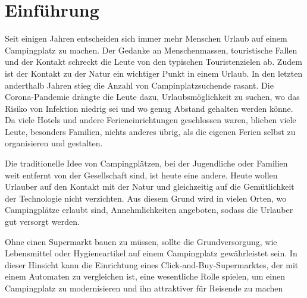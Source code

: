 \section{Einführung}



Seit einigen Jahren entscheiden sich immer mehr Menschen Urlaub auf einem Campingplatz zu machen. Der Gedanke an 
Menschenmassen, touristische Fallen und der Kontakt schreckt die Leute von den typischen Touristenzielen ab. Zudem 
ist der Kontakt zu der Natur ein wichtiger Punkt in einem Urlaub.  In den letzten anderthalb Jahren stieg die Anzahl 
von Campinplatzsuchende rasant. Die Corona-Pandemie drängte die Leute dazu, Urlaubsmöglichkeit zu suchen, wo das Risiko
von Infektion niedrig sei und wo genug Abstand gehalten werden könne. Da viele Hotels und andere Ferieneinrichtungen
geschlossen waren, blieben viele Leute, besonders Familien, nichts anderes übrig, als die eigenen Ferien selbst zu 
organisieren und gestalten.

Die traditionelle Idee von Campingplätzen, bei der Jugendliche oder Familien weit entfernt von der Gesellschaft sind, 
ist heute eine andere. Heute wollen Urlauber auf den Kontakt mit der Natur und gleichzeitig auf die Gemütlichkeit 
der Technologie nicht verzichten. Aus diesem Grund wird in vielen Orten, wo Campingplätze erlaubt sind, Annehmlichkeiten
angeboten, sodass die Urlauber gut versorgt werden.

Ohne einen Supermarkt bauen zu müssen, sollte die Grundversorgung, wie Lebensmittel oder Hygieneartikel auf einem 
Campingplatz gewährleistet sein. In dieser Hinsicht kann die Einrichtung eines Click-and-Buy-Supermarktes, der mit einem
 Automaten zu vergleichen ist, eine wesentliche Rolle spielen, um einen Campingplatz zu modernisieren und ihn 
 attraktiver für Reisende zu machen
